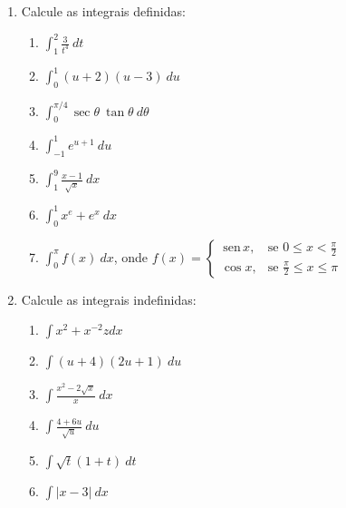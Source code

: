 \documentclass[a4paper,5pt]{amsbook}
\newcommand{\sen}{\,\mbox{sen}\,}
\newcommand{\ds}{\displaystyle}
\begin{document}
\vspace{1cm}
\begin{enumerate}
    \vspace{0.5cm}
    \item Calcule as integrais definidas:
    \begin{enumerate}
    	\item $\displaystyle\int_1^2 \frac{3}{t^4}\ dt$
        \vspace{0.3cm}
        \item $\ds\int_0^1 (u+2)(u-3)\ du$
        \vspace{0.3cm}
    	\item $\displaystyle\int_0^{\pi/4} \sec\theta\ \tan\theta\ d\theta$
        \vspace{0.3cm}
    	\item $\displaystyle\int_{-1}^1 e^{u+1}\ du$
        \vspace{0.3cm}
        \item $\ds\int_1^9 \frac{x-1}{\sqrt{x}}\ dx$
        \vspace{0.3cm}
    	\item $\displaystyle\int_0^1 x^e + e^x\ dx$
        \vspace{0.3cm}
    	\item $\displaystyle\int_0^{\pi} f(x)\ dx$, onde $f(x) = \left\{
    			\begin{array}{rl}
    				\sen x, & \mbox{se } 0 \le x < \frac{\pi}{2} \\
    				\cos x, & \mbox{se } \frac{\pi}{2} \le x \le \pi
    			\end{array}\right.$
    \end{enumerate}

    \vspace{0.5cm}
    \item Calcule as integrais indefinidas:
    \begin{enumerate}
        \item $\ds\int x^2+x^{-2}z dx$
        \vspace{0.3cm}
        \item $\ds\int (u+4)(2u+1)\ du$
        \vspace{0.3cm}
        \item $\ds\int \frac{x^2-2\sqrt{x}}{x}\ dx$
        \vspace{0.3cm}
        \item $\ds\int \frac{4+6u}{\sqrt{u}}\ du$
        \vspace{0.3cm}
        \item $\ds\int \sqrt{t}(1+t)\ dt$
        \vspace{0.3cm}
        \item $\ds\int |x-3|\ dx$
    \end{enumerate}
\end{enumerate}
\end{document}
